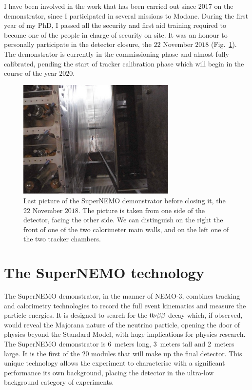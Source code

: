 I have been involved in the work that has been carried out since $2017$ on the demonstrator, since I participated in several missions to Modane.
During the first year of my PhD, I passed all the security and first aid training required to become one of the people in charge of security on site.
It was an honour to personally participate in the detector closure, the $22$ November $2018$ (Fig.~\ref{fig:detector_closing}).
The demonstrator is currently in the commissioning phase and almost fully calibrated, pending the start of tracker calibration phase which will begin in the course of the year $2020$.
\begin{figure}[h!]
\centering
\includegraphics[width=0.7\textwidth]{SNdemonstrator/fig_SNdemonstrator/detector_closing.pdf}
\caption{Last picture of the SuperNEMO demonstrator before closing it, the $22$ November $2018$.
  The picture is taken from one side of the detector, facing the other side.
  We can distinguish on the right the front of one of the two calorimeter main walls, and on the left one of the two tracker chambers.
\label{fig:detector_closing}}
\end{figure}

\section{The SuperNEMO technology}



The SuperNEMO demonstrator, in the manner of NEMO-$3$, combines tracking and calorimetry technologies to record the full event kinematics and measure the particle energies.
It is designed to search for the $0\nu\beta\beta$ decay which, if observed, would reveal the Majorana nature of the neutrino particle, opening the door of physics beyond the Standard Model, with huge implications for physics research.
The SuperNEMO demonstrator is $6$~meters long, $3$~meters tall and $2$~meters large.
It is the first of the $20$ modules that will make up the final detector.
This unique technology allows the experiment to characterise with a significant performance its own background, placing the detector in the ultra-low background category of experiments.


